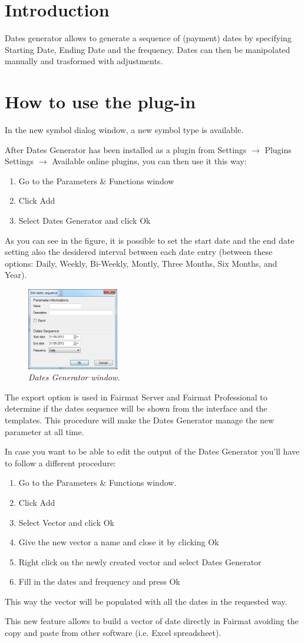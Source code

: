 \newcommand{\pluginName}{Dates Generator}
\newcommand{\pluginVersion}{1.0}




\section{Introduction}
Dates generator allows to generate a sequence of (payment) dates by specifying Starting Date, Ending Date and the frequency.  Dates can then be manipolated manually and trasformed with adjustments.
\section{How to use the plug-in}
In the new symbol dialog window, a new symbol type is available.

After Dates Generator has been installed as a plugin from Settings $\to$ Plugins Settings 
$\to$ Available online plugins, you can then use it this way: 
\begin{enumerate}
\item Go to the Parameters \& Functions window
\item Click Add
\item Select Dates Generator and click Ok
\end{enumerate}
As you can see in the figure\label{fig:DG}, it is possible to set the start date and the end date setting also the desidered interval between each date entry (between these options: Daily, Weekly, Bi-Weekly, Montly, Three Months, Six Months, and Year).
\begin{figure}[h!]
\includegraphics[width=4cm]{DG_img}
\centering
\caption{\small{\emph{Dates Generator window.}}}
\label{fig:DG}
\end{figure}
The export option is used in Fairmat Server and Fairmat Professional to determine if the dates sequence will be shown from the interface and the templates.
This procedure will make the Dates Generator manage the new parameter at all time. 

In case you want to be able to edit the output of the Dates Generator you'll have to follow a different procedure:
\begin{enumerate}
\item Go to the Parameters \& Functions window.
\item Click Add
\item Select Vector and click Ok
\item Give the new vector a name and close it by clicking Ok
\item Right click on the newly created vector and select Dates Generator
\item Fill in the dates and frequency and press Ok
\end{enumerate}

This way the vector will be populated with all the dates in the requested way.



This new feature allows to build a vector of date directly in Fairmat avoiding the 
copy and paste from other software (i.e. Excel spreadsheet).


